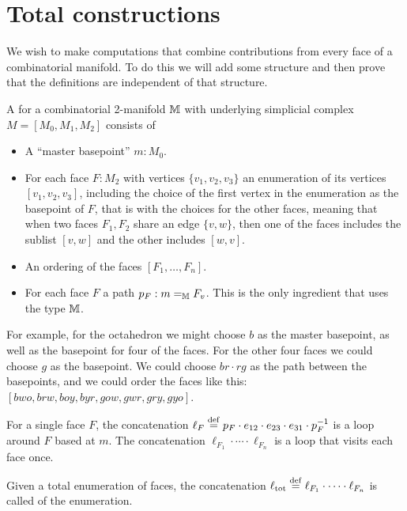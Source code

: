 \section{Total constructions}
We wish to make computations that combine contributions from every face of a combinatorial manifold. To do this we will add some structure and then prove that the definitions are independent of that structure.

\begin{mydef}
A  for a combinatorial 2-manifold \( \mathbb{M} \) with underlying simplicial complex \( M=[M_0, M_1, M_2] \) consists of
\begin{itemize}
\item A ``master basepoint'' \( m:M_0 \).
\item For each face \( F:M_2 \) with vertices \( \{v_1, v_2, v_3\} \) an enumeration of its vertices \( [v_1, v_2, v_3] \), including the choice of the first vertex in the enumeration as the basepoint of \( F \), that is  with the choices for the other faces, meaning that when two faces \( F_1,F_2 \) share an edge \( \{v, w\} \), then one of the faces includes the sublist \( [v, w] \) and the other includes \( [w, v] \).
\item An ordering of the faces \( [F_1,\ldots,F_n] \).
\item For each face \( F \) a path \( p_F:m=_{\mathbb{M}} F_v \). This is the only ingredient that uses the type \( \mathbb{M} \). 
\end{itemize}
\end{mydef}

For example, for the octahedron we might choose \( b \) as the master basepoint, as well as the basepoint for four of the faces. For the other four faces we could choose \( g \) as the basepoint. We could choose \( br\cdot rg \) as the path between the basepoints, and we could order the faces like this: \( [bwo, brw, boy, byr, gow, gwr, gry, gyo] \).

For a single face \( F \), the concatenation \( \ell_F\stackrel{\mathrm{def}}{=} p_F\cdot e_{12}\cdot e_{23}\cdot e_{31}\cdot p_F^{-1} \) is a loop around \( F \) based at \( m \). The concatenation \( \ell_{F_1}\cdot\cdots\cdot\ell_{F_n} \) is a loop that visits each face once.

\begin{mydef}
Given a total enumeration of faces, the concatenation \( \ell_{\mathrm{tot}}\stackrel{\mathrm{def}}{=}\ell_{F_1}\cdot\cdots\cdot\ell_{F_n} \) is called  of the enumeration.
\end{mydef}

